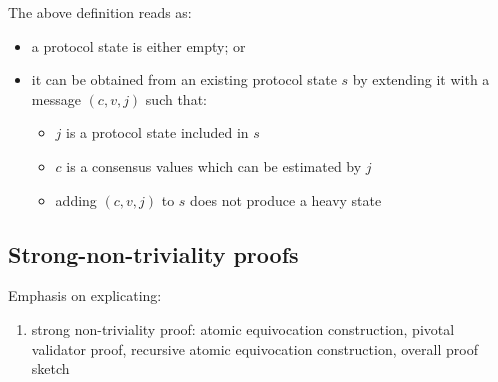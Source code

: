 The above definition reads as:
\begin{itemize}
    \item a protocol state is either empty; or
    \item it can be obtained from an existing protocol state $s$ by extending
        it with a message $(c, v, j)$ such that:
        \begin{itemize}
            \item $j$ is a protocol state included in $s$
            \item $c$ is a consensus values which can be estimated by $j$
            \item adding $(c,v,j)$ to $s$ does not produce a heavy state
        \end{itemize}
\end{itemize}

\subsection{Strong-non-triviality proofs}
Emphasis on explicating: 
\begin{enumerate}
	\item strong non-triviality proof: atomic equivocation construction, pivotal validator proof, recursive atomic equivocation construction, overall proof sketch
\end{enumerate}


